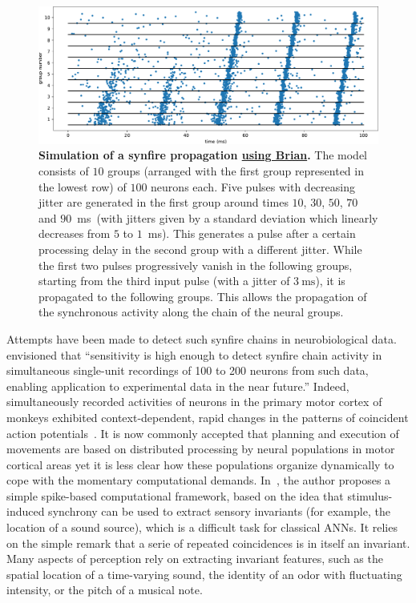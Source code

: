 \documentclass[brainsci, %
               review,submit,pdftex,moreauthors
               ]{Definitions/mdpi}
\newcommand{\ms}{\si{\milli\second}}%
\begin{document}
\begin{figure}
\centering
\includegraphics[width=\textwidth]{figures/Diesmann_et_al_1999.pdf}
\caption{\textbf{Simulation of a synfire propagation \href{https://brian2.readthedocs.io/en/stable/examples/frompapers.Diesmann_et_al_1999.html}{using Brian}.} The model consists of $10$ groups (arranged with the first group represented in the lowest row) of $100$ neurons each. Five pulses with decreasing jitter are generated in the first group around times $10$, $30$, $50$, $70$ and $90$~\ms~(with jitters given by a standard deviation which linearly decreases from $5$ to $1$~\ms). This generates a pulse after a certain processing delay in the second group with a different jitter. While the first two pulses progressively vanish in the following groups, starting from the third input pulse (with a jitter of $3~\ms$), it is propagated to the following groups. This allows the propagation of the synchronous activity along the chain of the neural groups.}\label{fig:diesman}
\end{figure}

Attempts have been made to detect such synfire chains in neurobiological data.~\citet{schrader_detecting_2008} envisioned that ``sensitivity is high enough to detect synfire chain activity in simultaneous single-unit recordings of 100 to 200 neurons from such data, enabling application to experimental data in the near future.'' Indeed, simultaneously recorded activities of neurons in the primary motor cortex of monkeys exhibited context-dependent, rapid changes in the patterns of coincident action potentials~\citep{riehle_spike_1997,grammont_precise_1999}. It is now commonly accepted that planning and execution of movements are based on distributed processing by neural populations in motor cortical areas yet it is less clear  how these populations organize dynamically to cope with the momentary computational demands.  In~\citep{brette_computing_2012}, the author proposes a simple spike-based computational framework, based on the idea that stimulus-induced synchrony can be used to extract sensory invariants (for example, the location of a sound source), which is a difficult task for classical ANNs. It relies on the simple remark that a serie of repeated coincidences is in itself an invariant. Many aspects of perception rely on extracting invariant features, such as the spatial location of a time-varying sound, the identity of an odor with fluctuating intensity, or the pitch of a musical note.
\end{document}
